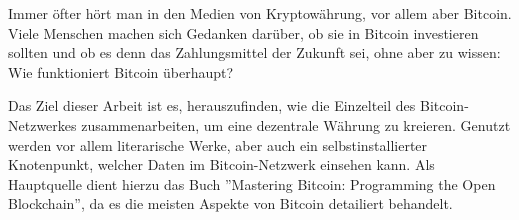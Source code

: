 Immer öfter hört man in den Medien von Kryptowährung, vor allem aber Bitcoin. Viele Menschen machen
sich Gedanken darüber, ob sie in Bitcoin investieren sollten und ob es denn das Zahlungsmittel der 
Zukunft sei, ohne aber zu wissen: Wie funktioniert Bitcoin überhaupt?

Das Ziel dieser Arbeit ist es, herauszufinden, wie die Einzelteil des Bitcoin-Netzwerkes zusammenarbeiten,
um eine dezentrale Währung zu kreieren. Genutzt werden vor allem literarische Werke, aber auch ein
selbstinstallierter Knotenpunkt, welcher Daten im Bitcoin-Netzwerk einsehen kann. Als Hauptquelle dient hierzu
das Buch ''Mastering Bitcoin: Programming the Open Blockchain'', da es die meisten Aspekte von Bitcoin
detailiert behandelt.
